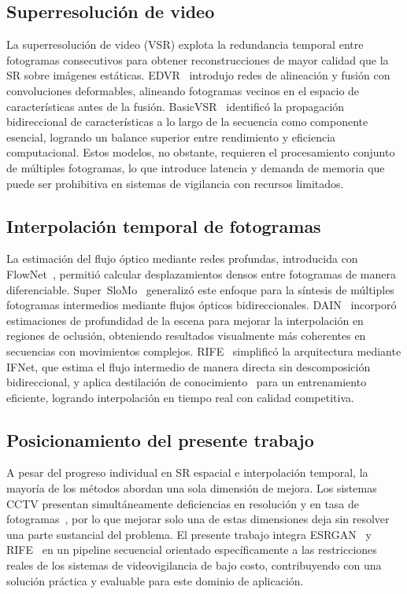 \documentclass[conference]{IEEEtran}
\begin{document}
\subsection{Superresolución de video}

La superresolución de video (VSR) explota la redundancia temporal entre fotogramas consecutivos para obtener reconstrucciones de mayor calidad que la SR sobre imágenes estáticas. EDVR~\cite{wang2019edvr} introdujo redes de alineación y fusión con convoluciones deformables, alineando fotogramas vecinos en el espacio de características antes de la fusión. BasicVSR~\cite{chan2021basicvsr} identificó la propagación bidireccional de características a lo largo de la secuencia como componente esencial, logrando un balance superior entre rendimiento y eficiencia computacional. Estos modelos, no obstante, requieren el procesamiento conjunto de múltiples fotogramas, lo que introduce latencia y demanda de memoria que puede ser prohibitiva en sistemas de vigilancia con recursos limitados.

\subsection{Interpolación temporal de fotogramas}

La estimación del flujo óptico mediante redes profundas, introducida con FlowNet~\cite{dosovitskiy2015flownet}, permitió calcular desplazamientos densos entre fotogramas de manera diferenciable. Super~SloMo~\cite{jiang2018superslomo} generalizó este enfoque para la síntesis de múltiples fotogramas intermedios mediante flujos ópticos bidireccionales. DAIN~\cite{bao2019dain} incorporó estimaciones de profundidad de la escena para mejorar la interpolación en regiones de oclusión, obteniendo resultados visualmente más coherentes en secuencias con movimientos complejos. RIFE~\cite{huang2022rife} simplificó la arquitectura mediante IFNet, que estima el flujo intermedio de manera directa sin descomposición bidireccional, y aplica destilación de conocimiento~\cite{hinton2015distilling} para un entrenamiento eficiente, logrando interpolación en tiempo real con calidad competitiva.

\subsection{Posicionamiento del presente trabajo}

A pesar del progreso individual en SR espacial e interpolación temporal, la mayoría de los métodos abordan una sola dimensión de mejora. Los sistemas CCTV presentan simultáneamente deficiencias en resolución y en tasa de fotogramas~\cite{li2011people}, por lo que mejorar solo una de estas dimensiones deja sin resolver una parte sustancial del problema. El presente trabajo integra ESRGAN~\cite{wang2018esrgan} y RIFE~\cite{huang2022rife} en un pipeline secuencial orientado específicamente a las restricciones reales de los sistemas de videovigilancia de bajo costo, contribuyendo con una solución práctica y evaluable para este dominio de aplicación.
\end{document}
